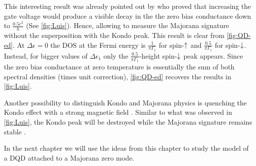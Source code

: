  This interesting result was already pointed out by  \citeauthor{ruiz-tijerina_interaction_2015}  
 who proved that increasing the gate voltage would produce a visible decay in the the zero bias conductance down to $\frac{0.5 e^2}{h}$ (See \ref{fig:Luis}). Hence, allowing to measure the Majorana signature without the superposition with the Kondo peak.  This result is clear from \ref{fig:QD-ed}. At $\Delta \epsilon = 0$ the DOS at the Fermi energy is $\frac{1}{\pi \Gamma_1}$ for spin-$\uparrow$ and $\frac{0.5}{\pi \Gamma_1}$ for spin-$\downarrow$. Instead, for bigger values of $\Delta \epsilon_1$  only the $\frac{0.5}{\pi \Gamma_1}$-height spin-$\downarrow$ peak appears.  Since the zero bias conductance at zero temperature is essentially the sum of both spectral densities (times unit correction), \ref{fig:QD-ed} recovers the results in \ref{fig:Luis}. 

 


Another possibility to distinguish Kondo and Majorana physics is quenching the Kondo effect with a strong magnetic field . Similar to what was observed in \ref{fig:Luis}, the Kondo peak will be destroyed while the Majorana signature remains stable \cite{ruiz-tijerina_interaction_2015}. 

In the next chapter we will use the ideas from this chapter  to study the model of a DQD attached to a Majorana zero mode.

